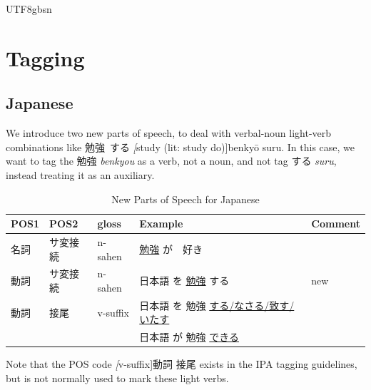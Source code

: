 \documentclass[12pt]{book} %
\newcommand{\jpn}[1]{\textit{#1}}
\newcommand{\ul}{\uline}
\begin{document}
\begin{CJK}{UTF8}{gbsn}


\section{Tagging}

\subsection{Japanese}
We introduce two new parts of speech, to deal with verbal-noun
light-verb combinations like 勉強\ する \jpn[study (lit: study
do)]{benky\=o suru}.  In this case, we want to tag
the 勉強 \jpn{benkyou} as a verb, not a noun, and not
tag する \jpn{suru}, instead treating it as an auxiliary.

\begin{table}
\begin{tabular}{lllll}
  POS1 & POS2 & gloss &Example & Comment\\
  \hline
  名詞 & サ変接続 & n-sahen & \ul{勉強} が　好き \\
  動詞 & サ変接続 & n-sahen & 日本語 を \ul{勉強} する & new\\
  動詞 & 接尾  & v-suffix & 日本語 を 勉強  \ul{する/なさる/致す/いたす} & \\
  　　 &  & & 日本語 が 勉強  \ul{できる} \\
\end{tabular}
\caption{New Parts of Speech for Japanese}
\end{table}
Note that the POS code \jpn[v-suffix]{動詞 接尾} exists in the IPA
tagging guidelines, but is not normally used to mark these light verbs.


\end{CJK}
\end{document}
